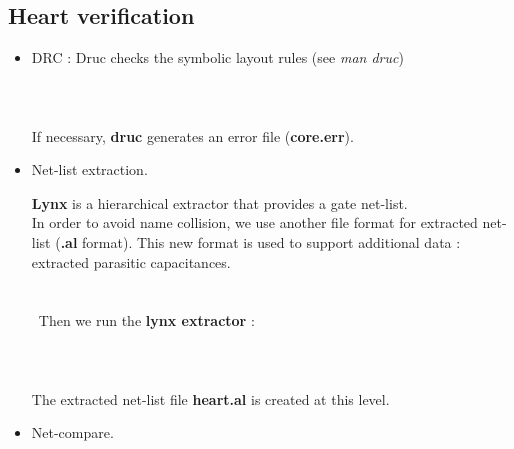 \documentclass[11pt,a4]{article}
\begin{document}
\subsection{Heart verification}

\begin{itemize}
\item {DRC} : Druc checks the symbolic layout rules
(see {\it man druc})\\
\\
\\
\\
If necessary, {\bf druc} generates an error file ({\bf core.err}).

\item {Net-list extraction}.

{\bf Lynx} is a hierarchical extractor that provides a gate net-list.\\
In order to avoid name collision, we use another file format
for extracted net-list ({\bf .al} format). This new format is used
to support additional data : extracted parasitic capacitances.\\
\\
\\
\
Then we run the {\bf lynx extractor} :\\
\\
\\
\\
The extracted net-list file {\bf heart.al} is created at this level.
\item {Net-compare}.


\end{itemize}
\end{document}

